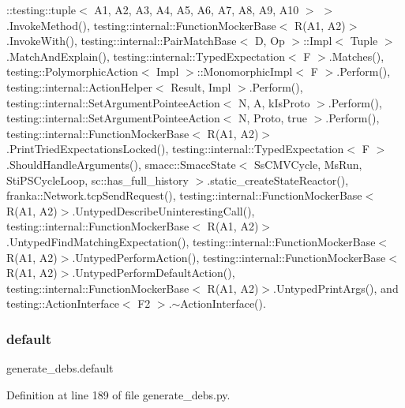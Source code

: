 \+::testing\+::tuple$<$ A1, A2, A3, A4, A5, A6, A7, A8, A9, A10 $>$ $>$.\+Invoke\+Method(), testing\+::internal\+::\+Function\+Mocker\+Base$<$ R(\+A1, A2)$>$.\+Invoke\+With(), testing\+::internal\+::\+Pair\+Match\+Base$<$ D, Op $>$\+::\+Impl$<$ Tuple $>$.\+Match\+And\+Explain(), testing\+::internal\+::\+Typed\+Expectation$<$ F $>$.\+Matches(), testing\+::\+Polymorphic\+Action$<$ Impl $>$\+::\+Monomorphic\+Impl$<$ F $>$.\+Perform(), testing\+::internal\+::\+Action\+Helper$<$ Result, Impl $>$.\+Perform(), testing\+::internal\+::\+Set\+Argument\+Pointee\+Action$<$ N, A, k\+Is\+Proto $>$.\+Perform(), testing\+::internal\+::\+Set\+Argument\+Pointee\+Action$<$ N, Proto, true $>$.\+Perform(), testing\+::internal\+::\+Function\+Mocker\+Base$<$ R(\+A1, A2)$>$.\+Print\+Tried\+Expectations\+Locked(), testing\+::internal\+::\+Typed\+Expectation$<$ F $>$.\+Should\+Handle\+Arguments(), smacc\+::\+Smacc\+State$<$ Ss\+C\+M\+V\+Cycle, Ms\+Run, Sti\+P\+S\+Cycle\+Loop, sc\+::has\+\_\+full\+\_\+history $>$.\+static\+\_\+create\+State\+Reactor(), franka\+::\+Network.\+tcp\+Send\+Request(), testing\+::internal\+::\+Function\+Mocker\+Base$<$ R(\+A1, A2)$>$.\+Untyped\+Describe\+Uninteresting\+Call(), testing\+::internal\+::\+Function\+Mocker\+Base$<$ R(\+A1, A2)$>$.\+Untyped\+Find\+Matching\+Expectation(), testing\+::internal\+::\+Function\+Mocker\+Base$<$ R(\+A1, A2)$>$.\+Untyped\+Perform\+Action(), testing\+::internal\+::\+Function\+Mocker\+Base$<$ R(\+A1, A2)$>$.\+Untyped\+Perform\+Default\+Action(), testing\+::internal\+::\+Function\+Mocker\+Base$<$ R(\+A1, A2)$>$.\+Untyped\+Print\+Args(), and testing\+::\+Action\+Interface$<$ F2 $>$.$\sim$\+Action\+Interface().

\mbox{\label{namespacegenerate__debs_a3d67a92b7eb3a59c397dc9fdd1c67558}} 
\subsubsection{\texorpdfstring{default}{default}}
{\footnotesize\ttfamily generate\+\_\+debs.\+default}



Definition at line 189 of file generate\+\_\+debs.\+py.

\mbox{\label{namespacegenerate__debs_ab09f4294da5036d5f6881672de9ed9c7}} 
